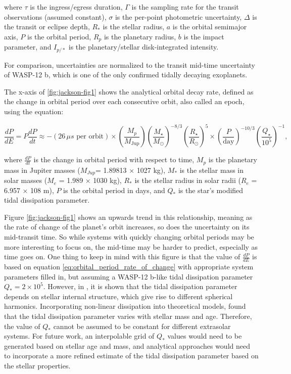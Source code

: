 \documentclass[oneside,12pt]{amsart}
\numberwithin{page}{section}
\begin{document}
where $\tau$ is the ingress/egress duration, $\Gamma$ is the sampling rate for the transit observations (assumed constant), $\sigma$ is the per-point photometric uncertainty, $\Delta$ is the transit or eclipse depth, $R_{*}$ is the stellar radius, $a$ is the orbital semimajor axis, $P$ is the orbital period, $R_{p}$ is the planetary radius, $b$ is the impact parameter, and $I_{p/*}$ is the planetary/stellar disk-integrated intensity. 

For comparison, uncertainties are normalized to the transit mid-time uncertainty of WASP-12 b, which is one of the only confirmed tidally decaying exoplanets. 

The x-axis of \ref{fig:jackson-fig1} shows the analytical orbital decay rate, defined as the change in orbital period over each consecutive orbit, also called an epoch, using the equation: 

\begin{equation}
    \frac{dP}{dE} = P \frac{dP}{dt} \approx - (26 \, \mu s \text{ per orbit})
    \times \left( \frac{M_p}{M_{\text{Jup}}} \right)
    \left( \frac{M_\star}{M_\odot} \right)^{-8/3}
    \left( \frac{R_\star}{R_\odot} \right)^{5}
    \times \left( \frac{P}{\text{day}} \right)^{-10/3}
    \left( \frac{Q_\star}{10^5} \right)^{-1},
    \label{eq:orbital_period_rate_of_change}
\end{equation}

where $\frac{dP}{dt}$ is the change in orbital period with respect to time, $M_p$ is the planetary mass in Jupiter masses ($M_{Jup}$=
1.89813 × 1027 kg), $M_*$ is the stellar mass in solar masses
($M_e$ = 1.989 × 1030 kg), $R_*$ is the stellar radius in solar radii ($R_e$ = 6.957 × 108 m), $P$ is the orbital period in days, and $Q_*$ is the star’s modified tidal dissipation parameter.

Figure \ref{fig:jackson-fig1} shows an upwards trend in this relationship, meaning as the rate of change of the planet's orbit increases, so does the uncertainty on its mid-transit time. So while systems with quickly changing orbital periods may be more interesting to focus on, the mid-time may be harder to predict, especially as time goes on. One thing to keep in mind with this figure is that the value of $\frac{dP}{dE}$ is based on equation \ref{eq:orbital_period_rate_of_change} with appropriate system parameters filled in, but assuming a WASP-12 b-like tidal dissipation parameter $Q_* = 2 \times 10^5$. However, in \citet{ogilvie2014tidal}, it is shown that the tidal dissipation parameter depends on stellar internal structure, which give rise to different spherical harmonics. Incorporating non-linear dissipation into theoretical models, \citet{weinberg2023orbital} found that the tidal dissipation parameter varies with stellar mass and age. Therefore, the value of $Q_*$ cannot be assumed to be constant for different extrasolar systems. For future work, an interpolable grid of $Q_*$ values would need to be generated based on stellar age and mass, and analytical approaches would need to incorporate a more refined estimate of the tidal dissipation parameter based on the stellar properties.
\end{document}
